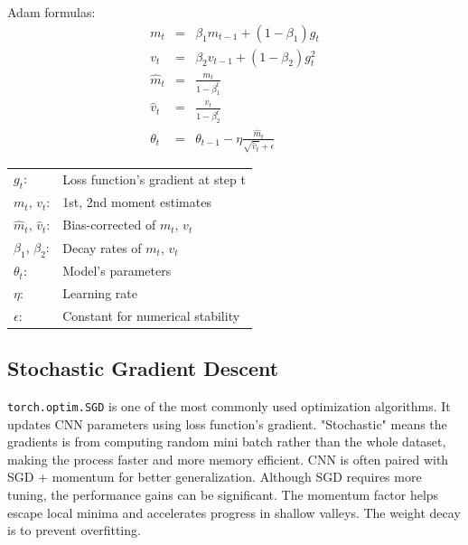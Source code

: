 \documentclass{report}
\begin{document}
Adam formulas:
\[
\begin{array}{rcl}
    m_t       & = & \beta_1 m_{t-1} + (1 - \beta_1) g_t                                 \\ [0.2cm]
    v_t       & = & \beta_2 v_{t-1} + (1 - \beta_2) g_t^2                               \\ [0.2cm]
    \hat{m}_t & = & \frac{m_t}{1 - \beta_1^t}                                           \\ [0.2cm]
    \hat{v}_t & = & \frac{v_t}{1 - \beta_2^t}                                           \\ [0.2cm]
    \theta_t  & = & \theta_{t-1} - \eta \frac{\hat{m}_t}{\sqrt{\hat{v}_t} + \epsilon}                           
\end{array}
\]

\begin{center}
    \begin{tabular}{ll}
        $g_t$:                    & Loss function's gradient at step t  \\
        $m_t$, $v_t$:             & 1st, 2nd moment estimates           \\
        $\hat{m}_t$, $\hat{v}_t$: & Bias-corrected of $m_t$, $v_t$      \\
        $\beta_1$, $\beta_2$:     & Decay rates of $m_t$, $v_t$         \\
        $\theta_t$:               & Model's parameters                  \\
        $\eta$:                   & Learning rate                       \\
        $\epsilon$:               & Constant for numerical stability
    \end{tabular}   
\end{center}

\subsection{Stochastic Gradient Descent}
\texttt{torch.optim.SGD} is one of the most commonly used optimization algorithms. It updates CNN parameters
using loss function's gradient. "Stochastic" means the gradients is from computing random mini batch rather 
than the whole dataset, making the process faster and more memory efficient. CNN is often paired with SGD 
+ momentum for better generalization. Although SGD requires more tuning, the performance gains can be 
significant. The momentum factor helps escape local minima and accelerates progress in shallow valleys.
The weight decay is to prevent overfitting.
\end{document}
